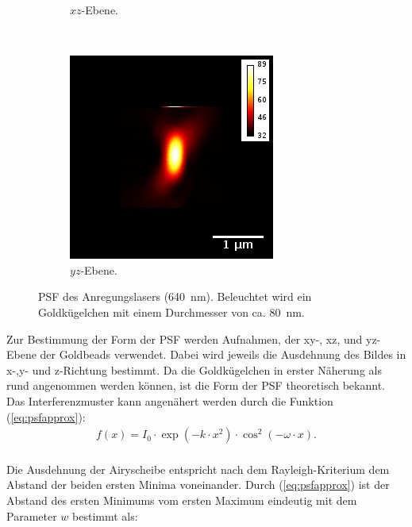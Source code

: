 \begin{figure}
\begin{subfigure}{0.3\textwidth}
		\caption{$xz$-Ebene.}
	\end{subfigure}
	~
	\begin{subfigure}{0.3\textwidth}
		\includegraphics[width=\textwidth]{plots/GoldBeads_3d_640nmyzwithbar.jpg}
		\caption{$yz$-Ebene.}
	\end{subfigure}
	\caption{PSF des Anregungslasers (640~nm). Beleuchtet wird ein Goldkügelchen mit einem Durchmesser von ca. 80~nm.}\label{fig:goldbeadpic}
\end{figure}
Zur Bestimmung der Form der PSF werden Aufnahmen, der xy-, xz, und yz-Ebene der Goldbeads verwendet. 
Dabei wird jeweils die Ausdehnung des Bildes in x-,y- und z-Richtung bestimmt.
Da die Goldkügelchen in erster Näherung als rund angenommen werden können, ist die Form der PSF theoretisch bekannt.
Das Interferenzmuster kann angenähert werden durch die Funktion (\ref{eq:psfapprox}):
\begin{align}
	f(x)=I_0 \cdot \exp \left( -k \cdot x^2 \right) \cdot \cos^2 \left(-\omega\cdot x\right). \label{eq:psfapprox}
\end{align}
\\ 
Die Ausdehnung der Airyscheibe entspricht nach dem Rayleigh-Kriterium dem Abstand der beiden ersten Minima voneinander. 
Durch (\ref{eq:psfapprox}) ist der Abstand des ersten Minimums vom ersten Maximum eindeutig mit dem Parameter $w$ bestimmt als:
